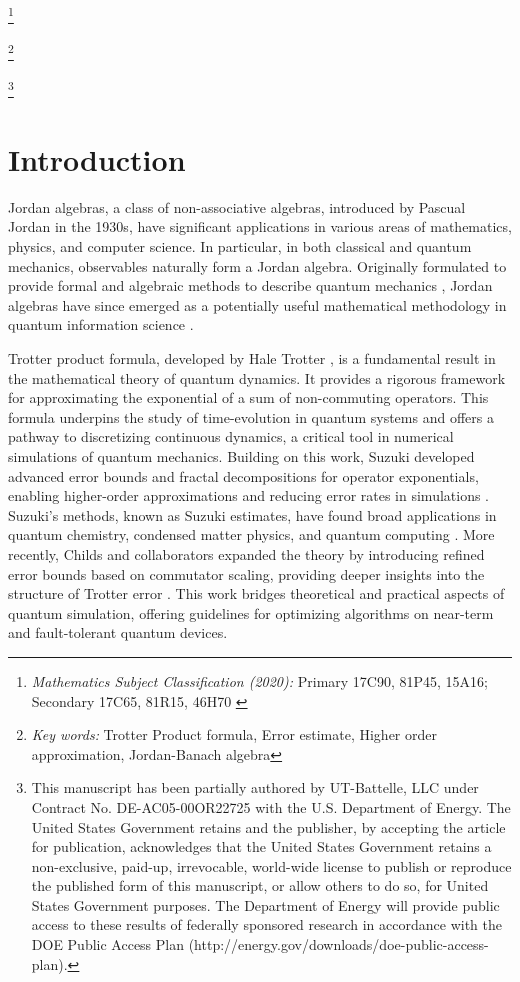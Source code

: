\documentclass{article}
\newcommand\nnfootnote[1]{%
  \begin{NoHyper}
  \renewcommand\thefootnote{}\footnote{#1}%
  \addtocounter{footnote}{-1}%
  \end{NoHyper}
}
\theoremstyle{plain} %
\numberwithin{equation}{section}
\begin{document}
\nnfootnote{\textit{Mathematics Subject Classification \rm{(2020)}:} {Primary
	17C90,
        81P45,
        15A16;
	Secondary
	17C65, 
	81R15,
        46H70
	}}

\nnfootnote{\textit{Key words:} Trotter Product formula, Error estimate, Higher order approximation, Jordan-Banach algebra}
\vspace{0.25cm}
 \nnfootnote{This manuscript has been partially authored by UT-Battelle, LLC under Contract No. DE-AC05-00OR22725 with the U.S. Department of Energy. The United States Government retains and the publisher, by accepting the article for publication, acknowledges that the United States Government retains a non-exclusive, paid-up, irrevocable, world-wide license to publish or reproduce the published form of this manuscript, or allow others to do so, for United States Government purposes. The Department of Energy will provide public access to these results of federally sponsored research in accordance with the DOE Public Access Plan (http://energy.gov/downloads/doe-public-access-plan).}
\section{Introduction}
Jordan algebras, a class of non-associative algebras, introduced by Pascual Jordan in the 1930s, have significant applications in various areas of mathematics, physics, and computer science. In particular, in both classical and quantum mechanics, observables naturally form a Jordan algebra. Originally formulated to provide formal and algebraic methods to describe quantum mechanics \cite{Jordan:Pascual:vonNeumann}, Jordan algebras have since emerged as a potentially useful mathematical methodology in quantum information science \cite{wang:wang:2021:means, wang:wang:2022:refined, wang:wang:2022:entropy}.

Trotter product formula, developed by Hale Trotter \cite{trotter:1959:product}, is a fundamental result in the mathematical theory of quantum dynamics. It provides a rigorous framework for approximating the exponential of a sum of non-commuting operators. 
This formula underpins the study of time-evolution in quantum systems and offers a pathway to discretizing continuous dynamics, a critical tool in numerical simulations of quantum mechanics.
Building on this work, Suzuki developed advanced error bounds and fractal decompositions for operator exponentials, enabling higher-order approximations and reducing error rates in simulations \cite{ suzuki:1976:generalized, suzuki:1985:transfer, suzuki:1990:fractal, suzuki:1991:general}. Suzuki's methods, known as Suzuki estimates, have found broad applications in quantum chemistry, condensed matter physics, and quantum computing \cite{Poulin:etal:chemistry}.
More recently, Childs and collaborators expanded the theory by introducing refined error bounds based on commutator scaling, providing deeper insights into the structure of Trotter error \cite{childs:etal:trotter}. This work bridges theoretical and practical aspects of quantum simulation, offering guidelines for optimizing algorithms on near-term and fault-tolerant quantum devices. 
\end{document}
